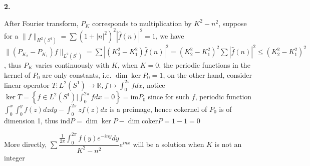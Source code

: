 \documentclass[../main.tex]{subfiles}
\begin{document}
\textbf{2.} \par
After Fourier transform, $P_K$ corresponds to multiplication by $K^2-n^2$, suppose for a $\|f\|_{H^2(S^1)}=\sum (1+|n|^2)^2|\widehat{f}(n)|^2=1$, we have $\|(P_{K_2}-P_{K_1})f\|_{L^2(S^1)}=\sum |(K_2^2-K_1^2)\widehat{f}(n)|^2=(K_2^2-K_1^2)^2\sum |\widehat{f}(n)|^2\leq (K_2^2-K_1^2)^2$, thus $P_K$ varies continuously with $K$, when $K=0$, the periodic functions in the kernel of $P_0$ are only constants, i.e. $\dim \ker P_0=1$, on the other hand, consider linear operator $T:L^2(S^1)\rightarrow\mathbb R, f\mapsto \int_{0}^{2\pi}fdx$, notice $\ker T=\left\{f\in L^2(S^1)|\int_{0}^{2\pi}fdx=0\right\}=\mathrm{im} P_0$ since for such $f$, periodic function $\int_{0}^{x}\int_{0}^{y}f(z)dzdy-\int_0^{2\pi}zf(z)dz$ is a preimage, hence cokernel of $P_0$ is of dimension 1, thus $\mathrm{ind} P=\dim\ker P-\dim\mathrm{coker} P=1-1=0$ \par
More directly, $\displaystyle\sum \dfrac{\frac{1}{2\pi}\int_0^{2\pi}f(y)e^{-iny}dy}{K^2-n^2}e^{inx}$ will be a solution when $K$ is not an integer \par
\end{document}

